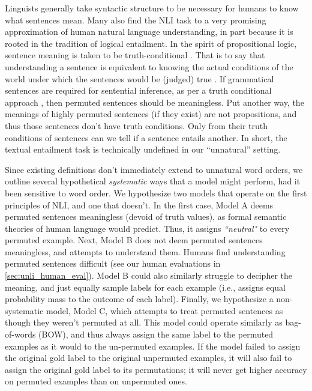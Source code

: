 \documentclass[letterpaper, 12pt]{report}
\begin{document}
Linguists generally take syntactic structure to be necessary for humans to know what sentences mean. Many also find the NLI task to a very promising approximation of human natural language understanding, in part because it is rooted in the tradition of logical entailment. In the spirit of propositional logic, sentence meaning is taken to be %
truth-conditional \citep{frege1948sense, montague-1970-universal, chierchia-mcconnell-1990-meaning, heim-kratzer-1998-semantics}. That is to say that understanding a sentence is equivalent to knowing the actual conditions of the world under which the sentences would be (judged) true \citep{wittgenstein-1922-tractatus}. If grammatical sentences are required for sentential inference, as per a truth conditional approach \citep{montague-1970-universal}, then permuted sentences should be meaningless. Put another way, the meanings of highly permuted sentences (if they exist) are not propositions, and thus those sentences don't have truth conditions. Only from their truth conditions of sentences can we tell if a sentence entails another.
In short, the textual entailment task is technically undefined in our ``unnatural'' setting. %


Since existing definitions don't immediately extend to unnatural word orders, we outline several hypothetical \textit{systematic} ways that a model might perform, had it been sensitive to word order. We hypothesize two models that operate on the first principles of NLI, and one that doesn't. In the first case, Model A deems permuted sentences meaningless (devoid of truth values), as formal semantic theories of human language would predict. Thus, it assigns \textit{``neutral"} to every permuted example. Next, Model B does not deem permuted sentences meaningless, and attempts to understand them. Humans find understanding permuted sentences difficult (see our human evaluations in \autoref{sec:unli_human_eval}). Model B could also similarly struggle to decipher the meaning, and just equally sample labels for each example (i.e., assigns equal probability mass to the outcome of each label). Finally, we hypothesize a non-systematic model, Model C, which attempts to treat permuted sentences as though they weren't permuted at all. This model could operate similarly as bag-of-words (BOW), and thus always assign the same label to the permuted examples as it would to the un-permuted examples. If the model failed to assign the original gold label to the original unpermuted examples, it will also fail to assign the original gold label to its permutations; it will never get higher accuracy on permuted examples than on unpermuted ones.
\end{document}
